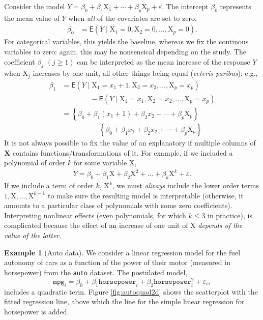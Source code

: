 \documentclass[
  11pt,
  letterpaper,
]{book}
\theoremstyle{definition}
\theoremstyle{definition}
\newtheorem{example}{Example}[chapter]
\theoremstyle{definition}
\theoremstyle{remark}
\begin{document}
Consider the model \(Y= \beta_0 + \beta_1 \mathrm{X}_1 + \cdots + \beta_p\mathrm{X}_p + \varepsilon\). The intercept \(\beta_0\) represents the mean value of \(Y\) when \emph{all} of the covariates are set to zero,
\begin{align*}
\beta_0 &= \mathsf{E}(Y \mid \mathrm{X}_1=0,\mathrm{X}_2=0,\ldots,\mathrm{X}_p=0).
\end{align*}
For categorical variables, this yields the baseline, whereas we fix the continous variables to zero: again, this may be nonsensical depending on the study. The coefficient \(\beta_j\) \((j \geq 1)\) can be interpreted as the mean increase of the response \(Y\) when \(\mathrm{X}_j\) increases by one unit, all other things being equal (\emph{ceteris paribus}); e.g.,
\begin{align*}
\beta_1 &= \mathsf{E}(Y \mid \mathrm{X}_1=x_1+1,\mathrm{X}_2=x_2,\ldots,\mathrm{X}_p=x_p) \\
& \qquad \qquad - \mathsf{E}(Y \mid \mathrm{X}_1=x_1,\mathrm{X}_2=x_2,\ldots,\mathrm{X}_p=x_p) \\
&= \left\{\beta_0 + \beta_1 (x_1+1) + \beta_2 x_2 + \cdots +\beta_p \mathrm{X}_p \right\} \\
& \qquad \qquad -\left\{\beta_0 + \beta_1 x_1 + \beta_2 x_2 + \cdots +\beta_p \mathrm{X}_p \right\} 
\end{align*}
It is not always possible to fix the value of an explanatory if multiple columns of \(\mathbf{X}\) contains functions/transformations of it. For example, if we included a polynomial of order \(k\) for some variable \(\mathrm{X}\),
\begin{align*}
Y=\beta_0+ \beta_1 \mathrm{X}+ \beta_2 \mathrm{X}^2 + \ldots +\beta_k \mathrm{X}^k + \varepsilon.
\end{align*}
If we include a term of order \(k\), \(\mathrm{X}^k\), we must \emph{always} include the lower order terms \(1, \mathrm{X}, \ldots, \mathrm{X}^{k-1}\) to make sure the resulting model is interpretable (otherwise, it amounts to a particular class of polynomials with some zero coefficients). Interpreting nonlinear effects (even polynomials, for which \(k\leq 3\) in practice), is complicated because the effect of an increase of one unit of \(\mathrm{X}\) \emph{depends of the value of the latter}.

\begin{example}[Auto data]
\protect\hypertarget{exm:auto}{}{\label{exm:auto} {} }We consider a linear regression model for the fuel autonomy of cars as a function of the power of their motor (measured in horsepower) from the \texttt{auto} dataset. The postulated model,
\[
\texttt{mpg}_i = \beta_0 + \beta_1 \texttt{horsepower}_i + \beta_2 \texttt{horsepower}_i^2 + \varepsilon_i,
\]
includes a quadratic term. Figure \ref{fig:autoquad2d} shows the scatterplot with the fitted regression line, above which the line for the simple linear regression for horsepower is added.
\end{example}
\end{document}
